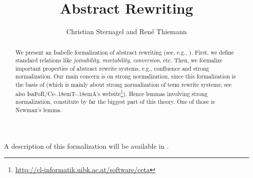 \documentclass[11pt,a4paper]{article}
\newcommand\isafor{\textsf{IsaFoR}}
\newcommand\ceta{\textsf{Ce\kern-.18emT\kern-.18emA}}
\begin{document}
\title{Abstract Rewriting}
\author{Christian Sternagel and Ren\'e Thiemann}
\maketitle

\begin{abstract}
We present an Isabelle formalization of abstract rewriting (see, e.g.,
\cite{BaaderNipkow}). First, we define standard relations like
\emph{joinability}, \emph{meetability}, \emph{conversion}, etc. Then, we
formalize important properties of abstract rewrite systems, e.g.,
confluence and strong normalization. Our main concern is on strong
normalization, since this formalization is the basis of \cite{CeTA} (which
is mainly about strong normalization of term rewrite systems; see also
\isafor/\ceta's
website\footnote{\url{http://cl-informatik.uibk.ac.at/software/ceta}}).
Hence lemmas involving strong normalization, constitute by far the biggest
part of this theory. One of those is Newman's lemma.
\end{abstract}

\tableofcontents

A description of this formalization will be available in
\cite{Sternagel2010}.





\end{document}
